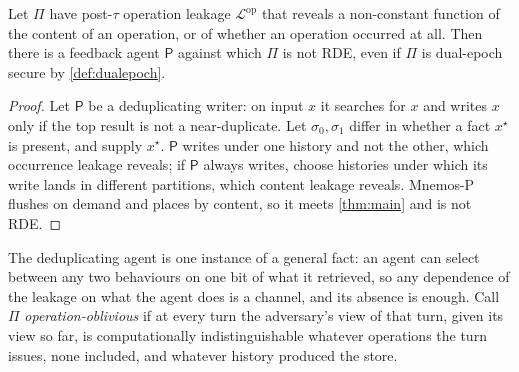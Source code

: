 \begin{proposition}
\label{prop:derived}
Let $\Pi$ have post-$\tau$ operation leakage $\mathcal{L}^{\mathrm{op}}$ that reveals a non-constant
function of the content of an operation, or of whether an operation occurred at all. Then there is a
feedback agent $\mathsf{P}$ against which $\Pi$ is not RDE, even if $\Pi$ is dual-epoch secure by
\cref{def:dualepoch}.
\end{proposition}

\begin{proof}
Let $\mathsf{P}$ be a deduplicating writer: on input $x$ it searches for $x$ and writes $x$ only if
the top result is not a near-duplicate. Let $\sigma_0,\sigma_1$ differ in whether a fact $x^\star$ is
present, and supply $x^\star$. $\mathsf{P}$ writes under one history and not the other, which
occurrence leakage reveals; if $\mathsf{P}$ always writes, choose histories under which its write
lands in different partitions, which content leakage reveals. Mnemos-P flushes on demand and places
by content, so it meets \cref{thm:main} and is not RDE.
\end{proof}

The deduplicating agent is one instance of a general fact: an agent can select between any two
behaviours on one bit of what it retrieved, so any dependence of the leakage on what the agent does
is a channel, and its absence is enough. Call $\Pi$ \emph{operation-oblivious} if at every turn the
adversary's view of that turn, given its view so far, is computationally indistinguishable whatever
operations the turn issues, none included, and whatever history produced the store.


